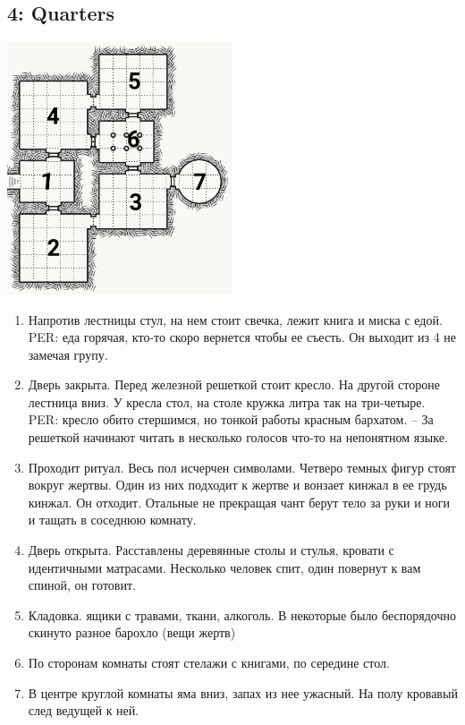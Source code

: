 \documentclass[a5paper,11pt]{book}
\begin{document}
\begin{multicols}{2}
\subsection{4: Quarters}
\includegraphics[width=0.5\textwidth]{4}
\begin{enumerate}
\item Напротив лестницы стул, на нем стоит свечка, лежит книга и миска с едой. PER: еда горячая, кто-то скоро вернется чтобы ее съесть. Он выходит из 4 не замечая групу.
\item Дверь закрыта. Перед железной решеткой стоит кресло. На другой стороне лестница вниз. У кресла стол, на столе кружка литра так на три-четыре. PER: кресло обито стершимся, но тонкой работы красным бархатом. -- За решеткой начинают читать в несколько голосов что-то на непонятном языке.
\item Проходит ритуал. Весь пол исчерчен символами. Четверо темных фигур стоят вокруг жертвы. Один из них подходит к жертве и вонзает кинжал в ее грудь кинжал. Он отходит. Отальные не прекращая чант берут тело за руки и ноги и тащать в соседнюю комнату.
\item Дверь открыта. Расставлены деревянные столы и стулья, кровати с идентичными матрасами. Несколько человек спит, один повернут к вам спиной, он готовит.
\item Кладовка. ящики с травами, ткани, алкоголь. В некоторые было беспорядочно скинуто разное барохло (вещи жертв)
\item По сторонам комнаты стоят стелажи с книгами, по середине стол.
\item В центре круглой комнаты яма вниз, запах из нее ужасный. На полу кровавый след ведущей к ней.
\end{enumerate}

\pagebreak


\end{multicols}
\end{document}
